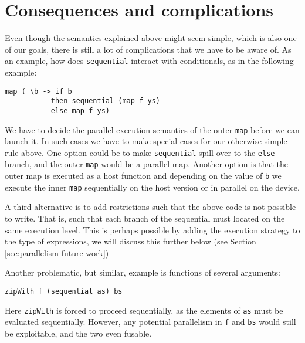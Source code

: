 \section{Consequences and complications}

Even though the semantics explained above might seem simple, which is
also one of our goals, there is still a lot of complications that we
have to be aware of. As an example, how does \lstinline{sequential}
interact with conditionals, as in the following example:
\begin{lstlisting}
map ( \b -> if b
           then sequential (map f ys)
           else map f ys)
\end{lstlisting}
We have to decide the parallel execution semantics of the outer
\lstinline{map} before we can launch it. In such cases we have to make
special cases for our otherwise simple rule above. One option could be
to make \lstinline{sequential} spill over to the
\lstinline{else}-branch, and the outer \lstinline{map} would be a
parallel map. Another option is that the outer map is executed as a
host function and depending on the value of \lstinline{b} we
execute the inner \lstinline{map} sequentially on the host version or
in parallel on the device.

A third alternative is to add restrictions such that the above code is
not possible to write. That is, such that each branch of the
sequential must located on the same execution level. This is perhaps
possible by adding the execution strategy to the type of expressions,
we will discuss this further below (see Section \ref{sec:parallelism-future-work})

Another problematic, but similar, example is functions of several arguments:
\begin{lstlisting}
zipWith f (sequential as) bs
\end{lstlisting}

Here \lstinline{zipWith} is forced to proceed sequentially, as the elements of
\lstinline{as} must be evaluated sequentially. However, any potential
parallelism in \lstinline{f} and \lstinline{bs} would still be exploitable,
and the two even fusable.

